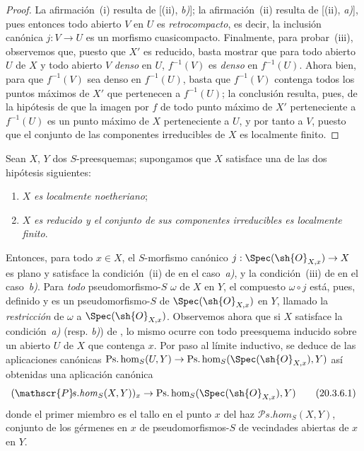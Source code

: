 \begin{proof}
La afirmación~(i) resulta de [(ii), \emph{b)}]; la afirmación~(ii) resulta de [(ii), \emph{a)}], pues entonces todo abierto $V$ en $U$ es \emph{retrocompacto}, es decir, la inclusión canónica $j:V\to U$ es un morfismo cuasicompacto.
Finalmente, para probar~(iii), observemos que, puesto que $X'$ es reducido, basta mostrar que para todo abierto $U$ de $X$ y todo abierto $V$ \emph{denso} en $U$, $f^{-1}(V)$ es \emph{denso} en $f^{-1}(U)$.
Ahora bien, para que $f^{-1}(V)$ sea denso en $f^{-1}(U)$, basta que $f^{-1}(V)$ contenga todos los puntos máximos de $X'$ que pertenecen a $f^{-1}(U)$; la conclusión resulta, pues, de la hipótesis de que la imagen por $f$ de todo punto
máximo de $X'$ perteneciente a $f^{-1}(U)$ es un punto máximo de $X$ perteneciente a $U$, y por tanto a $V$, puesto que el conjunto de las componentes irreducibles de $X$ es localmente finito.
\end{proof}

\begin{env}[20.3.6]
\label{IV.20.3.6}
Sean $X$, $Y$ dos $S$-preesquemas; supongamos que $X$ satisface una de las dos hipótesis siguientes:
\begin{enumerate}[label=\alph*)]
  \item $X$ \emph{es localmente noetheriano};
  \item $X$ \emph{es reducido y el conjunto de sus componentes irreducibles es localmente finito}.
\end{enumerate}
Entonces, para todo $x\in X$, el $S$-morfismo canónico $j:\Spec(\sh{O}_{X,x})\to X$ es plano y satisface la condición~(ii) de  en el caso~\emph{a)}, y la condición~(iii) de  en el caso~\emph{b)}.
Para \emph{todo} pseudomorfismo-$S$ $\omega$ de $X$ en $Y$, el compuesto $\omega\circ j$ está, pues, definido y es un pseudomorfismo-$S$ de $\Spec(\sh{O}_{X,x})$ en $Y$, llamado la \emph{restricción} de $\omega$ a $\Spec(\sh{O}_{X,x})$.
Observemos ahora que si $X$ satisface la condición~\emph{a)} (resp. \emph{b)}) de , lo mismo ocurre con todo preesquema inducido sobre un abierto $U$ de $X$ que contenga $x$.
Por paso al límite inductivo, se deduce de las aplicaciones canónicas $\operatorname{Ps.hom}_S(U,Y)\to\operatorname{Ps.hom}_S(\Spec(\sh{O}_{X,x}),Y)$ así obtenidas una aplicación canónica
\[
\label{IV.20.3.6.1}
  (\mathscr{P}\!s.\mathit{hom}_S(X,Y))_x\to\operatorname{Ps.hom}_S(\Spec(\sh{O}_{X,x}),Y)
  \tag{20.3.6.1}
\]
donde el primer miembro es el tallo en el punto $x$ del haz $\mathscr{P}\!s.\mathit{hom}_S(X,Y)$, conjunto de los gérmenes en $x$ de pseudomorfismos-$S$ de vecindades abiertas de $x$ en $Y$.
\end{env}

